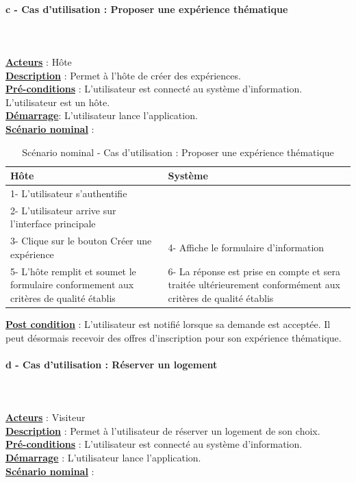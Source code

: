 \newpage
\paragraph{c - Cas d'utilisation : Proposer une expérience thématique} 
$ $\\$ $\\\underline{\textbf{Acteurs}} : Hôte
\\\underline{\textbf{Description}} : Permet à l'hôte de créer des expériences.
\\\underline{\textbf{Pré-conditions}} : L'utilisateur est connecté au système d’information. L’utilisateur est un hôte.
\\\underline{\textbf{Démarrage}}: L’utilisateur lance l’application.
\\\underline{\textbf{Scénario nominal}} :

\begin{table}[H]
\begin{center}
\begin{tabular}{|p{8cm}|p{8cm}|}
\hline
Hôte & Système\\
\hline
1- L’utilisateur s’authentifie & $ $\\
\hline
2- L’utilisateur arrive sur l’interface principale & $ $\\
\hline	
3- Clique sur le bouton Créer une expérience & 4- Affiche le formulaire d’information\\
\hline
5- L'hôte remplit et soumet le formulaire conformement aux critères de qualité établis & 6- La réponse est prise en compte et sera traitée ultérieurement conformément aux critères de qualité établis\\
\hline
\end{tabular}
\caption{Scénario nominal - Cas d'utilisation : Proposer une expérience thématique}
\end{center}
\end{table}
\begin{flushleft}
\underline{\textbf{Post condition}} : L’utilisateur est notifié lorsque sa demande est acceptée. Il peut désormais recevoir des offres d’inscription pour son expérience thématique.
\end{flushleft}

\paragraph{d - Cas d'utilisation : Réserver un logement} 
$ $\\$ $\\\underline{\textbf{Acteurs}} : Visiteur
\\\underline{\textbf{Description}} : Permet à l’utilisateur de réserver un logement de son choix.
\\\underline{\textbf{Pré-conditions}} : L'utilisateur est connecté au système d’information.
\\\underline{\textbf{Démarrage}} : L’utilisateur lance l’application.
\\\underline{\textbf{Scénario nominal}} :

